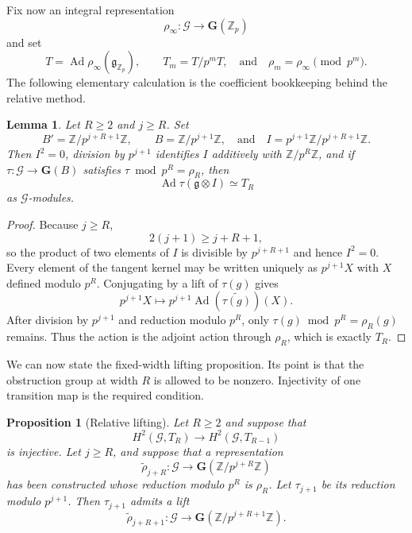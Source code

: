 \documentclass[11pt]{amsart}
\numberwithin{equation}{section}
\newcommand{\Z}{\mathbb Z}
\newcommand{\Zp}{\mathbb Z_p}
\newcommand{\Ad}{\operatorname{Ad}}
\newcommand{\frakg}{\mathfrak g}
\newcommand{\GG}{\mathbf G}
\newtheorem{proposition}[theorem]{Proposition}
\newtheorem{lemma}[theorem]{Lemma}
\theoremstyle{definition}
\begin{document}
Fix now an integral representation
\[
        \rho_\infty:\mathcal G\longrightarrow\GG(\Zp)
\]
and set
\[
        T=\Ad\rho_\infty(\frakg_{\Zp}),
        \qquad T_m=T/p^mT,
        \quad \text{and}\quad \rho_m=\rho_\infty\pmod{p^m}.
\]
The following elementary calculation is the coefficient bookkeeping
behind the relative method.

\begin{lemma}\label{lem:window-coeff}
Let $R\ge2$ and $j\ge R$. Set
\[
 B'=\Z/p^{j+R+1}\Z,
 \qquad
 B=\Z/p^{j+1}\Z,
 \quad \text{and}\quad 
 I=p^{j+1}\Z/p^{j+R+1}\Z.
\]
Then $I^2=0$, division by $p^{j+1}$ identifies $I$ additively with
$\Z/p^R\Z$, and if
$\tau:\mathcal G\to\GG(B)$ satisfies
$\tau\bmod p^R=\rho_R$, then
\[
        \Ad\tau(\frakg\otimes I)\simeq T_R
\]
as $\mathcal G$-modules.
\end{lemma}

\begin{proof}
Because $j\ge R$,
\[
        2(j+1)\ge j+R+1,
\]
so the product of two elements of $I$ is divisible by
$p^{j+R+1}$ and hence $I^2=0$.  Every element of the tangent kernel may
be written uniquely as $p^{j+1}X$ with $X$ defined modulo $p^R$.
Conjugating by a lift of $\tau(g)$ gives
\[
 p^{j+1}X\longmapsto
 p^{j+1}\Ad(\widetilde{\tau(g)})(X).
\]
After division by $p^{j+1}$ and reduction modulo $p^R$, only
$\tau(g)\bmod p^R=\rho_R(g)$ remains.  Thus the action is the adjoint
action through $\rho_R$, which is exactly $T_R$.
\end{proof}

We can now state the fixed-width lifting proposition. Its point is
that the obstruction group at width $R$ is allowed to be nonzero.
Injectivity of one transition map is the required condition.

\begin{proposition}[Relative lifting]\label{prop:relative-lifting}
Let $R\ge2$ and suppose that
\[
 H^2(\mathcal G,T_R)\longrightarrow H^2(\mathcal G,T_{R-1})
\]
is injective. Let $j\ge R$, and suppose that a representation
\[
 \widetilde\rho_{j+R}:\mathcal G
 \longrightarrow\GG(\Z/p^{j+R}\Z)
\]
has been constructed whose reduction modulo $p^R$ is $\rho_R$.  Let
$\tau_{j+1}$ be its reduction modulo $p^{j+1}$.  Then $\tau_{j+1}$
admits a lift
\[
 \widetilde\rho_{j+R+1}:\mathcal G
 \longrightarrow\GG(\Z/p^{j+R+1}\Z).
\]
\end{proposition}
\end{document}
